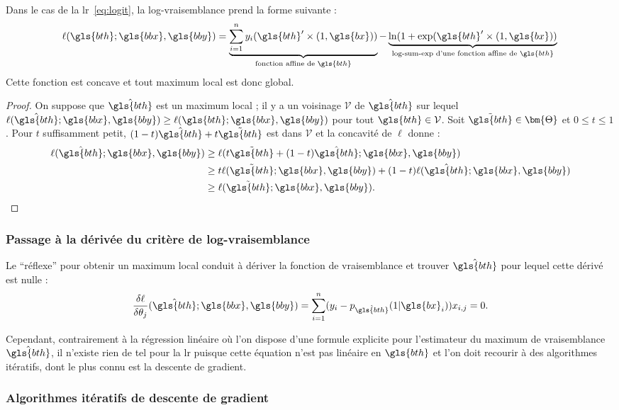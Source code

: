 Dans le cas de la \gls{lr}~\eqref{eq:logit}, la log-vraisemblance prend la forme suivante :
\[ \ell(\gls{bth};\gls{bbx},\gls{bby}) = \underbrace{\sum_{i=1}^n y_i (\gls{bth}' \times (1,\gls{bx}))}_{\text{fonction affine de } \gls{bth}} - \underbrace{\ln(1 + \exp(\gls{bth}' \times (1,\gls{bx}))}_{\text{log-sum-exp d'une fonction affine de } \gls{bth}} \qedhere \]
Cette fonction est concave et tout maximum local est donc global. 
\begin{proof}
On suppose que $\hat{\gls{bth}}$ est un maximum local ; il y a un voisinage $\mathcal{V}$ de $\hat{\gls{bth}}$ sur lequel $\ell(\hat{\gls{bth}};\gls{bbx},\gls{bby}) \geq \ell(\gls{bth};\gls{bbx},\gls{bby})$ pour tout $\gls{bth} \in \mathcal{V}$. Soit $\tilde{\gls{bth}} \in \bm{\Theta}$ et $0 \leq t \leq 1$. Pour $t$ suffisamment petit, $(1-t)\hat{\gls{bth}} + t \tilde{\gls{bth}}$ est dans $\mathcal{V}$ et la concavité de $\ell$ donne :
\begin{align*}
\ell(\hat{\gls{bth}};\gls{bbx},\gls{bby}) & \geq \ell(t \tilde{\gls{bth}} + (1-t)\hat{\gls{bth}};\gls{bbx},\gls{bby}) \\
& \geq t \ell(\tilde{\gls{bth}};\gls{bbx},\gls{bby}) + (1-t) \ell(\hat{\gls{bth}};\gls{bbx},\gls{bby}) \\
& \geq \ell(\tilde{\gls{bth}};\gls{bbx},\gls{bby}).
\end{align*}
\end{proof}

\subsubsection{Passage à la dérivée du critère de log-vraisemblance}

Le ``réflexe'' pour obtenir un maximum local conduit à dériver la fonction de vraisemblance et trouver $\hat{\gls{bth}}$ pour lequel cette dérivé est nulle :
\[ \dfrac{\delta \ell}{\delta \theta_j} (\hat{\gls{bth}};\gls{bbx},\gls{bby})= \sum_{i=1}^n (y_i - p_{\hat{\gls{bth}}}(1|\gls{bx}_i)) x_{i,j} = 0.\]

Cependant, contrairement à la régression linéaire où l'on dispose d'une formule explicite pour l'estimateur du maximum de vraisemblance $\hat{\gls{bth}}$, il n'existe rien de tel pour la \gls{lr} puisque cette équation n'est pas linéaire en $\gls{bth}$ et l'on doit recourir à des algorithmes itératifs, dont le plus connu est la descente de gradient.

\subsubsection{Algorithmes itératifs de descente de gradient}

